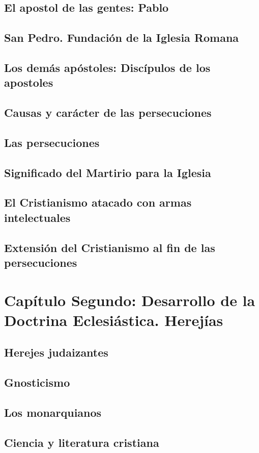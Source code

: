 \raggedbottom{} \documentclass[12pt, a4paper]{book}
\begin{document}
\section{El apostol de las gentes: Pablo}
\section{San Pedro. Fundación de la Iglesia Romana}
\section{Los demás apóstoles: Discípulos de los apostoles}
\section{Causas y carácter de las persecuciones}
\section{Las persecuciones}
\section{Significado del Martirio para la Iglesia}
\section{El Cristianismo atacado con armas intelectuales}
\section{Extensión del Cristianismo al fin de las persecuciones}
\chapter{Capítulo Segundo: Desarrollo de la Doctrina Eclesiástica. Herejías}
\section{Herejes judaizantes}
\section{Gnosticismo}
\section{Los monarquianos}
\section{Ciencia y literatura cristiana}
\end{document}
